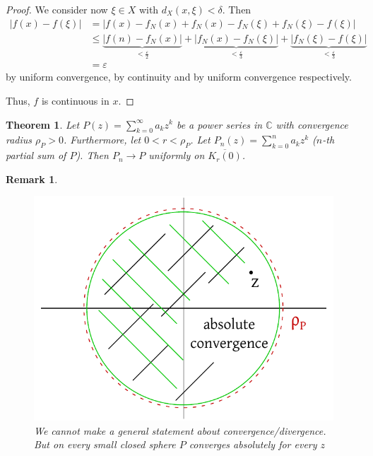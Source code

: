 \documentclass{article}
\newtheorem{theorem}{Theorem}  \numberwithin{theorem}{section}
\newtheorem{remark}{Remark}  \numberwithin{remark}{section}
\newcommand{\card}[1]{\left|#1\right|}
\begin{document}
\begin{proof}
  We consider now $\xi \in X$ with $d_X(x, \xi) < \delta$. Then
  \begin{align*}
    \card{f(x) - f(\xi)}
      &= \card{f(x) - f_N(x) + f_N(x) - f_N(\xi) + f_N(\xi) - f(\xi)} \\
      &\leq \underbrace{\card{f(n) - f_N(x)}}_{< \frac\varepsilon2} + \underbrace{\card{f_N(x) - f_N(\xi)}}_{< \frac\varepsilon3} + \underbrace{\card{f_N(\xi) - f(\xi)}}_{< \frac\varepsilon3} \\
      &= \varepsilon
  \end{align*}
  by uniform convergence, by continuity and by uniform convergence respectively.

  Thus, $f$ is continuous in $x$.
\end{proof}

\begin{theorem} %
  Let $P(z) = \sum_{k=0}^\infty a_k z^k$ be a power series in $\mathbb C$ with convergence radius $\rho_P > 0$.
  Furthermore, let $0 < r < \rho_P$.
  Let $P_n(z) = \sum_{k=0}^n a_k z^k$ ($n$-th partial sum of $P$).
  Then $P_n \to P$ uniformly on $\overline{K_r(0)}$.
\end{theorem}

\begin{remark}
  \begin{figure}[t]
    \begin{center}
      \includegraphics{img/26_uniform_convergence.pdf}
      \caption{We cannot make a general statement about convergence/divergence. But on every small closed sphere $P$ converges absolutely for every $z$}
      \label{img:uconv}
    \end{center}
  \end{figure}
\end{remark}
\end{document}
